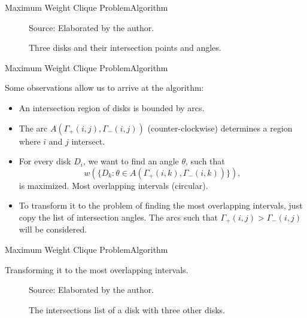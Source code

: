 \documentclass{beamer}
\newcommand{\source}[1]{\caption*{Source: {#1}} }
\begin{document}
\begin{frame}{Maximum Weight Clique Problem}{Algorithm}
	\begin{figure}[H]
		\centering
		
		\caption{Three disks and their intersection points and angles.}
		
		\source{Elaborated by the author.}
		\label{fig:3disks_intersect}
	\end{figure}
\end{frame}


\begin{frame}{Maximum Weight Clique Problem}{Algorithm}
	
	Some observations allow us to arrive at the algorithm:
	
	
	\begin{itemize}
		\item An intersection region of disks is bounded by arcs.
		
		\item The arc $A(\Gamma_+(i,j),\Gamma_-(i,j))$ (counter-clockwise) determines a region where $i$ and $j$ intersect.
		

		\item For every disk $D_i$, we want to find an angle $\theta$, such that $$w(\{D_k : \theta \in A(\Gamma_+(i,k),\Gamma_-(i,k))\}),$$ is maximized. Most overlapping intervals (circular).
		
		\item To transform it to the problem of finding the most overlapping intervals, just copy the list of intersection angles. The arcs such that $\Gamma_+(i,j) > \Gamma_-(i,j)$ will be considered.
	\end{itemize}
\end{frame}

\begin{frame}{Maximum Weight Clique Problem}{Algorithm}
	
	Transforming it to the most overlapping intervals.
	
	\begin{figure}[H]
		\centering
		
		\caption{The intersections list of a disk with three other disks.}
		
		\source{Elaborated by the author.}
	\end{figure}
\end{frame}
\end{document}
